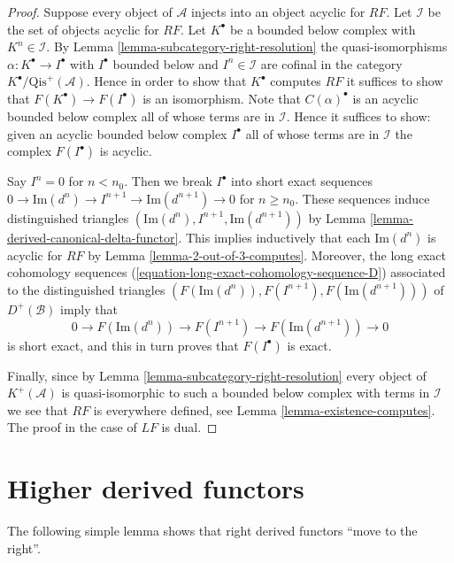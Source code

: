 \begin{proof}
Suppose every object of $\mathcal{A}$ injects into an object acyclic
for $RF$. Let $\mathcal{I}$ be the set of objects acyclic for $RF$.
Let $K^\bullet$ be a bounded below complex with $K^n \in \mathcal{I}$. By
Lemma \ref{lemma-subcategory-right-resolution}
the quasi-isomorphisms $\alpha : K^\bullet \to I^\bullet$ with
$I^\bullet$ bounded below and $I^n \in \mathcal{I}$ are cofinal in
the category $K^\bullet/\text{Qis}^+(\mathcal{A})$. Hence in order to
show that $K^\bullet$ computes $RF$ it suffices to show that
$F(K^\bullet) \to F(I^\bullet)$ is an isomorphism.
Note that $C(\alpha)^\bullet$ is an acyclic bounded below complex
all of whose terms are in $\mathcal{I}$.
Hence it suffices to show: given an acyclic bounded below complex
$I^\bullet$ all of whose terms are in $\mathcal{I}$ the complex
$F(I^\bullet)$ is acyclic.

\medskip\noindent
Say $I^n = 0$ for $n < n_0$. Then we break $I^\bullet$ into short
exact sequences
$0 \to \text{Im}(d^n) \to I^{n + 1} \to \text{Im}(d^{n + 1}) \to 0$
for $n \geq n_0$. These sequences induce distinguished triangles
$(\text{Im}(d^n), I^{n + 1}, \text{Im}(d^{n + 1}))$ by
Lemma \ref{lemma-derived-canonical-delta-functor}.
This implies inductively that
each $\text{Im}(d^n)$ is acyclic for $RF$ by
Lemma \ref{lemma-2-out-of-3-computes}.
Moreover, the long exact cohomology sequences
(\ref{equation-long-exact-cohomology-sequence-D})
associated to the distinguished triangles
$(F(\text{Im}(d^n)), F(I^{n + 1}), F(\text{Im}(d^{n + 1})))$
of $D^{+}(\mathcal{B})$ imply that
$$
0 \to F(\text{Im}(d^n)) \to F(I^{n + 1}) \to F(\text{Im}(d^{n + 1})) \to 0
$$
is short exact, and this in turn proves that $F(I^\bullet)$ is exact.

\medskip\noindent
Finally, since by
Lemma \ref{lemma-subcategory-right-resolution}
every object of $K^{+}(\mathcal{A})$ is quasi-isomorphic to such
a bounded below complex with terms in $\mathcal{I}$ we see that
$RF$ is everywhere defined, see
Lemma \ref{lemma-existence-computes}.
The proof in the case of $LF$ is dual.
\end{proof}






\section{Higher derived functors}
\label{section-higher-derived}

\noindent
The following simple lemma shows that right derived functors
``move to the right''.

